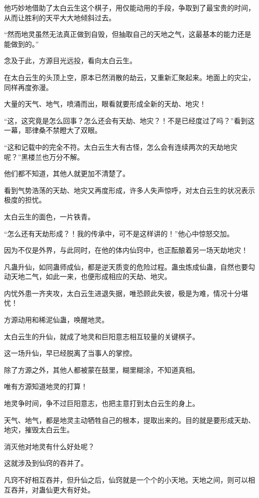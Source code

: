 \begin{this_body}
他巧妙地借助了太白云生这个棋子，用仅能动用的手段，争取到了最宝贵的时间，从而让胜利的天平大大地倾斜过去。

“然而地灵虽然无法真正做到自毁，但抽取自己的天地之气，这最基本的能力还是能做到的。”

念及于此，方源目光远投，看向太白云生。

在太白云生的头顶上空，原本已然消散的劫云，又重新汇聚起来。地面上的灾尘，同样再度弥漫。

大量的天气、地气，喷涌而出，眼看就要形成全新的天劫、地灾！

“这，这究竟是怎么回事？怎么还会有天劫、地灾？！不是已经度过了吗？”看到这一幕，耶律桑不禁瞪大了双眼。

“这和记载中的完全不符。太白云生大有古怪，怎么会有连续两次的天劫地灾呢？”黑楼兰也万分不解。

他们都不知道，其他人就更加不清楚了。

看到气势浩荡的天劫、地灾又再度形成，许多人失声惊呼，对太白云生的状况表示极度的担忧。

太白云生的面色，一片铁青。

“怎么还有天劫形成？！我的传承中，可不是这样讲的！”他心中惊怒交加。

因为不仅是外界，与此同时，在他的体内仙窍中，也正酝酿着另一场天劫地灾！

凡蛊升仙，如同蛊师成仙，都是逆天质变的危险过程。蛊虫炼成仙蛊，自然也要勾动天地二气，如此一来，也便形成相应的天劫、地灾。

内忧外患一齐夹攻，太白云生进退失据，唯恐顾此失彼，极是为难，情况十分堪忧！

方源动用和稀泥仙蛊，唤醒地灵。

太白云生的升仙，就成了地灵和巨阳意志相互较量的关键棋子。

这一场升仙，早已经脱离了当事人的掌控。

除了方源之外，其他人都被蒙在鼓里，糊里糊涂，不知道真相。

唯有方源知道地灵的打算！

地灵争时间，争不过巨阳意志，也把主意打到太白云生的身上。

天气、地气，都是地灵主动牺牲自己的根本，提取出来的。目的就是要形成天劫、地灾，摧毁太白云生。

消灭他对地灵有什么好处呢？

这就涉及到仙窍的吞并了。

凡窍不好相互吞并，但升仙之后，仙窍就是一个个的小天地。天地之间，则可以相互吞并，对蛊仙更大有好处。


\end{this_body}
